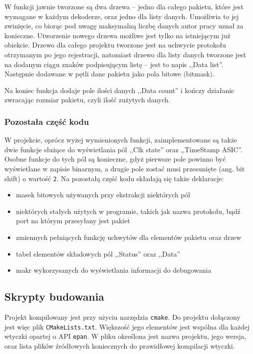 \documentclass[a4paper, 11pt, twoside, openright]{article}
\begin{document}
	W funkcji jawnie tworzone są dwa drzewa -- jedno dla całego pakietu, które jest wymagane w każdym dekoderze, oraz jedno
	dla listy danych. Umożliwia to jej zwinięcie, co biorąc pod uwagę maksymalną liczbę danych autor pracy uznał za konieczne.
	Utworzenie nowego drzewa możliwe jest tylko na istniejącym już obiekcie. Drzewo dla całego projektu
	tworzone jest na uchwycie protokołu otrzymanym po jego rejestracji, natomiast drzewo dla listy danych tworzone jest na dodanym
	ciągu znaków podpisującym listę -- jest to napis ,,Data list''. Następnie dodawane w pętli dane pakietu jako pola bitowe $($bitmask$)$.

	Na koniec funkcja dodaje pole ilości danych ,,Data count'' i kończy działanie zwracając rozmiar pakietu, czyli ilość zużytych danych.

	\subsubsection{Pozostała część kodu}

	\indent\par
	W projekcie, oprócz wyżej wymienionych funkcji, zaimplementowane są także dwie funkcje służące do wyświetlania pól ,,Clk state'' oraz ,,TimeStamp ASIC''.
	Osobne funkcje do tych pól są konieczne, gdyż pierwsze pole powinno być wyświetlane w zapisie binarnym, a drugie pole zostać musi przesunięte (ang. bit shift)
	o wartość \texttt{2}. Na pozostałą część kodu składają się także deklaracje:
	\begin{itemize}
		\item masek bitowych używanych przy ekstrakcji niektórych pól
		\item niektórych stałych użytych w programie, takich jak nazwa protokołu, bądź port na którym przesyłany jest pakiet
		\item zmiennych pełniących funkcję uchwytów dla elementów pakietu oraz drzew
		\item tabel elementów składowych pól ,,Status'' oraz ,,Data''
		\item makr wykorzysanych do wyświetlania informacji do debugowania
	\end{itemize}

	\subsection{Skrypty budowania}

	\indent\par
	Projekt kompilowany jest przy użyciu narzędzia \texttt{cmake}. Do projektu dołączony jest więc plik \texttt{CMakeLists.txt}.
	Większość jego elementów jest wspólna dla każdej wtyczki opartej o API \texttt{epan}.
	W pliku określona jest nazwa projektu, jego wersja, oraz lista plików źródłowych koniecznych do prawidłowej kompilacji wtyczki.
\end{document}
